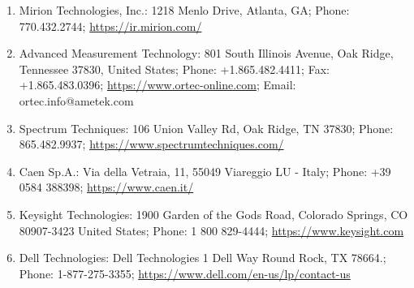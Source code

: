 \documentclass[12pt]{article}
\begin{document}
\begin{table}[!h]
\begin{tabular}{c|cccc}
    \end{tabular}
    \begin{enumerate}[label=\alph*]
        \item\label{addr:mirion}
        Mirion Technologies, Inc.:
        1218 Menlo Drive,
        Atlanta, GA;
        Phone: 770.432.2744;
        \url{https://ir.mirion.com/}
        \item\label{addr:ortec}
        Advanced Measurement Technology:
        801 South Illinois Avenue,
        Oak Ridge, Tennessee 37830,
        United States;
        Phone: +1.865.482.4411;
        Fax: +1.865.483.0396;
        \url{https://www.ortec-online.com};
        Email: ortec.info@ametek.com
        \item\label{addr:spect}
        Spectrum Techniques:
        106 Union Valley Rd, Oak Ridge, TN 37830;
        Phone: 865.482.9937;
        \url{https://www.spectrumtechniques.com/}
        \item\label{addr:caen}
        Caen Sp.A.:
        Via della Vetraia, 11, 55049 Viareggio LU - Italy;
        Phone: +39 0584 388398;
        \url{https://www.caen.it/}
        \item\label{addr:keys}
        Keysight Technologies: 
        1900 Garden of the Gods Road, Colorado Springs, CO 80907-3423 United States;
        Phone: 1 800 829-4444;
        \url{https://www.keysight.com}
        \item\label{addr:dell}
        Dell Technologies:
        Dell Technologies
        1 Dell Way
        Round Rock, TX 78664.;
        Phone: 1-877-275-3355;
        \url{https://www.dell.com/en-us/lp/contact-us}
    \end{enumerate}
\end{table}
\FloatBarrier
\end{document}

